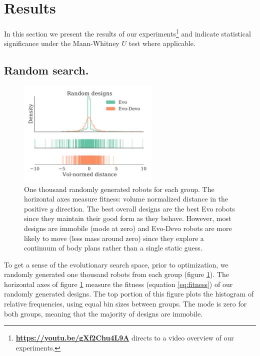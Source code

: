 \section{Results}
\label{sec:results}


In this section we present the results of our experiments\footnote{\href{https://youtu.be/gXf2Chu4L9A}{\textbf{https://youtu.be/gXf2Chu4L9A}} directs to a video overview of our experiments.} and indicate statistical significance under the Mann-Whitney $U$ test where applicable. 




\subsection{Random search.}


\begin{figure}[t]
\centering
\includegraphics[width=0.6\textwidth]{Chapter03/img/random_distributions_gecco}
\caption{\label{fig:random} One thousand randomly generated robots for each group. 
The horizontal axes measure fitness: volume normalized distance in the positive $y$ direction.
The best overall designs are the best Evo robots since they maintain their good form as they behave. However, most designs are immobile (mode at zero) and Evo-Devo robots are more likely to move (less mass around zero) since they explore a continuum of body plans rather than a single static guess.}
\end{figure}


To get a sense of the evolutionary search space, prior to optimization, we randomly generated one thousand robots from each group (figure \ref{fig:random}).
The horizontal axes of figure \ref{fig:random} measure the fitness (equation \ref{eq:fitness}) of our randomly generated designs.
The top portion of this figure plots the histogram of relative frequencies, using equal bin sizes between groups.
The mode is zero for both groups, meaning that the majority of designs are immobile.

